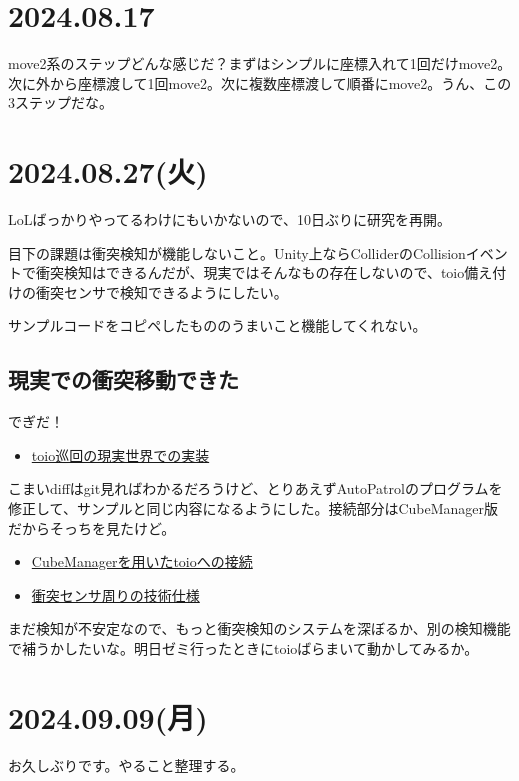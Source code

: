 \documentclass[fleqn,twocolumn]{mynote}
\begin{document}
\section*{2024.08.17}
move2系のステップどんな感じだ？まずはシンプルに座標入れて1回だけmove2。次に外から座標渡して1回move2。次に複数座標渡して順番にmove2。うん、この3ステップだな。

\section*{2024.08.27(火)}
LoLばっかりやってるわけにもいかないので、10日ぶりに研究を再開。

目下の課題は衝突検知が機能しないこと。Unity上ならColliderのCollisionイベントで衝突検知はできるんだが、現実ではそんなもの存在しないので、toio備え付けの衝突センサで検知できるようにしたい。

サンプルコードをコピペしたもののうまいこと機能してくれない。

\subsection*{現実での衝突移動できた}
でぎだ！

\begin{itemize}
  \item \href{https://www.youtube.com/watch?v=-0CJAu6-GsE}{toio巡回の現実世界での実装}
\end{itemize}

こまいdiffはgit見ればわかるだろうけど、とりあえずAutoPatrolのプログラムを修正して、サンプルと同じ内容になるようにした。接続部分はCubeManager版だからそっちを見たけど。

\begin{itemize}
  \item \href{https://morikatron.github.io/toio-sdk-for-unity/docs/tutorials_basic.html#9-cubemanager\%E3\%82\%AF\%E3\%83\%A9\%E3\%82\%B9\%E3\%82\%92\%E7\%94\%A8\%E3\%81\%84\%E3\%81\%9F\%E3\%82\%BD\%E3\%83\%BC\%E3\%82\%B9\%E3\%82\%B3\%E3\%83\%BC\%E3\%83\%89\%E3\%81\%AE\%E7\%B0\%A1\%E7\%95\%A5\%E5\%8C\%96}{CubeManagerを用いたtoioへの接続}
  \item \href{https://toio.github.io/toio-spec/docs/ble_sensor/}{衝突センサ周りの技術仕様}
\end{itemize}

まだ検知が不安定なので、もっと衝突検知のシステムを深ぼるか、別の検知機能で補うかしたいな。明日ゼミ行ったときにtoioばらまいて動かしてみるか。

\section*{2024.09.09(月)}
お久しぶりです。やること整理する。
\end{document}
